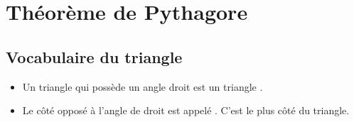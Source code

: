 \section{Théorème de Pythagore}
\subsection{Vocabulaire du triangle}
\begin{vocab}
    \begin{itemize}
        \item Un triangle qui possède un angle droit est un triangle .
        \item Le côté opposé à l'angle de droit est appelé . C'est
            le plus  côté du triangle.
    \end{itemize}
\end{vocab}
